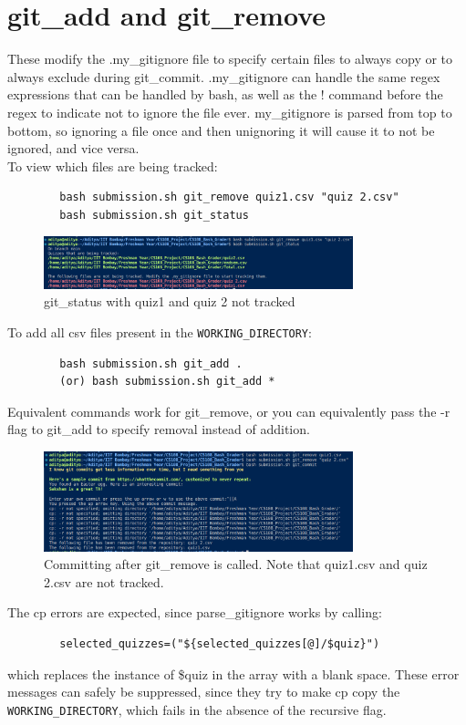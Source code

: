 \documentclass{article}
\begin{document}
    \section{git\_add and git\_remove}
    These modify the .my\_gitignore file to specify certain files to always copy or to always exclude during git\_commit. .my\_gitignore can handle the same regex expressions that can be handled by bash, as well as the ! command before the regex to indicate not to ignore the file ever. my\_gitignore is parsed from top to bottom, so ignoring a file once and then unignoring it will cause it to not be ignored, and vice versa.\\
    To view which files are being tracked:
    \begin{lstlisting}
        bash submission.sh git_remove quiz1.csv "quiz 2.csv"
        bash submission.sh git_status
    \end{lstlisting}
    \begin{figure}[htbp]
        \centering
        \includegraphics[width=0.8\textwidth]{git_status_some_quizzes_removed.png}
        \caption{git\_status with quiz1 and quiz 2 not tracked}
        \label{fig:git_status}
    \end{figure}
    To add all csv files present in the \texttt{WORKING\_DIRECTORY}:
    \begin{lstlisting}
        bash submission.sh git_add .
        (or) bash submission.sh git_add *
    \end{lstlisting}
    Equivalent commands work for git\_remove, or you can equivalently pass the -r flag to git\_add to specify removal instead of addition.\\
    \begin{figure}[htbp]
        \centering
        \includegraphics[width=0.8\textwidth]{committing after git remove.png}
        \caption{Committing after git\_remove is called. Note that quiz1.csv and quiz 2.csv are not tracked.}
        \label{fig:git_status_all}
    \end{figure}
    The cp errors are expected, since parse\_gitignore works by calling:
    \begin{lstlisting}
        selected_quizzes=("${selected_quizzes[@]/$quiz}")        
    \end{lstlisting}
    which replaces the instance of \$quiz in the array with a blank space. These error messages can safely be suppressed, since they try to make cp copy the \texttt{WORKING\_DIRECTORY}, which fails in the absence of the recursive flag. 
\end{document}
